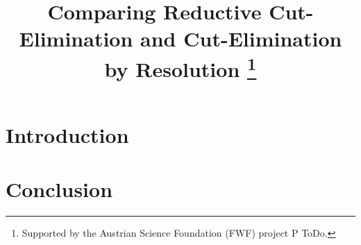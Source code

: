 \documentclass{llncs}
\title{
  Comparing Reductive Cut-Elimination and Cut-Elimination by Resolution
  \thanks{Supported by the Austrian Science Foundation (FWF) project P ToDo.}
}
\author{
}
\institute{
  Theory and Logic Group, Vienna University of Technology, Vienna, Austria \\
}
\begin{document}
\maketitle



\begin{abstract}

\end{abstract}

\section{Introduction}


\section{Conclusion}





%
\end{document}
